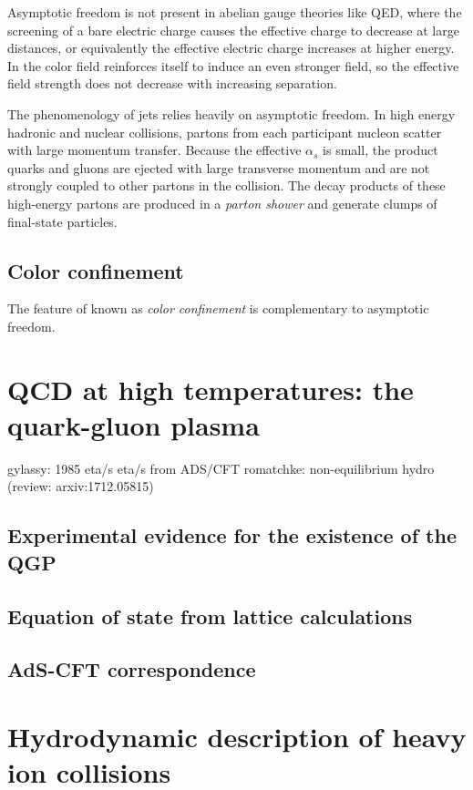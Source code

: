 Asymptotic freedom is not present in abelian gauge theories like \ac{QED}, where the screening of a bare electric charge causes the effective charge to decrease at large distances, or equivalently the effective electric charge increases at higher energy.
In \qcd the color field reinforces itself to induce an even stronger field, so the effective field strength does not decrease with increasing separation.

The phenomenology of jets relies heavily on asymptotic freedom.
In high energy hadronic and nuclear collisions, partons from each participant nucleon scatter with large momentum transfer.
Because the effective $\alpha_s$ is small, the product quarks and gluons are ejected with large transverse momentum and are not strongly coupled to other partons in the collision.
The decay products of these high-energy partons are produced in a \emph{parton shower} and generate clumps of final-state particles.

\subsection{Color confinement}

The feature of \qcd known as \emph{color confinement} is complementary to asymptotic freedom.

\section{QCD at high temperatures: the quark-gluon plasma}
 gylassy: 1985 eta/s \cite{Danielewicz:1984ww}
 eta/s from ADS/CFT \cite{Kovtun:2004de}
 romatchke: non-equilibrium hydro \cite{Romatschke:2016hle,Romatschke:2017vte} (review: arxiv:1712.05815)
 
\subsection{Experimental evidence for the existence of the QGP}
\subsection{Equation of state from lattice calculations}
\subsection{AdS-CFT correspondence}

\section{Hydrodynamic description of heavy ion collisions}
